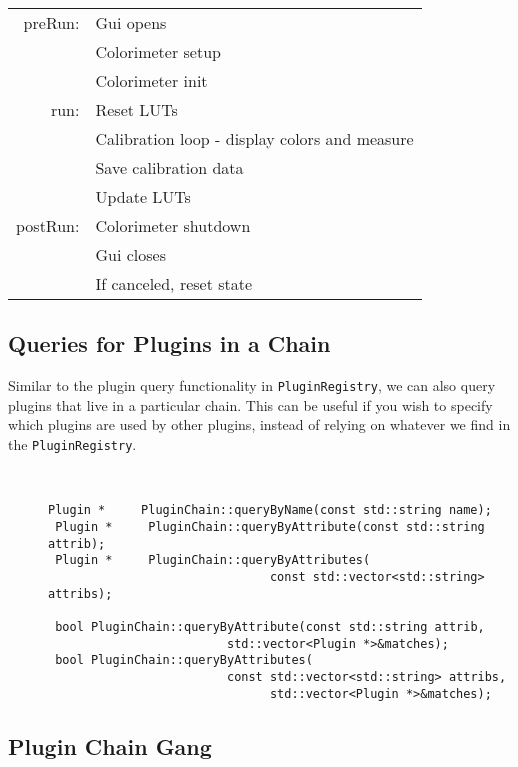 \begin{center}
\begin{tabular}{rl}
   preRun: & Gui opens         \\
           & Colorimeter setup \\
           & Colorimeter init  \\ \hline
   run:    & Reset LUTs \\
           & Calibration loop - display colors and measure \\
           & Save calibration data \\
           & Update LUTs \\ \hline
   postRun:& Colorimeter shutdown\\
           & Gui closes \\
           & If canceled, reset state
\end{tabular}
\end{center}

\subsection{Queries for Plugins in a Chain}

Similar to the plugin query functionality in {\tt PluginRegistry}, we can
also query plugins that live in a particular chain. This can be useful if 
you wish to specify which plugins are used by other plugins, instead of
relying on whatever we find in the {\tt PluginRegistry}.

\begin{description}
\item[] \
\begin{lstlisting}[frame=single]
 Plugin *     PluginChain::queryByName(const std::string name);
 Plugin *     PluginChain::queryByAttribute(const std::string attrib);
 Plugin *     PluginChain::queryByAttributes(
                               const std::vector<std::string> attribs);
       
 bool PluginChain::queryByAttribute(const std::string attrib, 
                         std::vector<Plugin *>&matches);
 bool PluginChain::queryByAttributes(
                         const std::vector<std::string> attribs, 
                               std::vector<Plugin *>&matches);
\end{lstlisting}
\end{description}



\subsection{Plugin Chain Gang}

